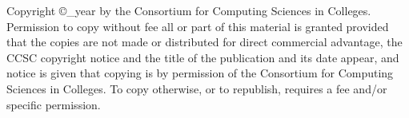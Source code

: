Copyright \copyright \conf_year by the Consortium for Computing Sciences in Colleges.
Permission to copy without fee all or part of this material is granted provided
that the copies are not made or distributed for direct commercial advantage,
the CCSC copyright notice and the title of the publication and its date appear,
and notice is given that copying is by permission of the Consortium for
Computing Sciences in Colleges.  To copy otherwise, or to republish, requires
a fee and/or specific permission.
